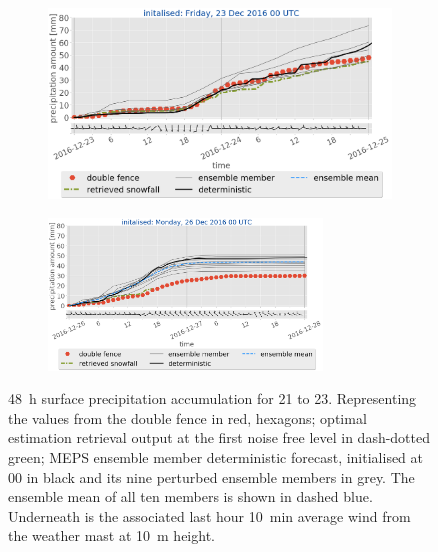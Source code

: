 \begin{figure}[H]
	\begin{subfigure}[t]{0.99\textwidth}	\includegraphics[trim={0.cm 5.2cm 0.cm 0cm},clip,width=\textwidth]{./fig_sfc_acc/acc_wind_20161223_00}
		\caption{}\label{fig:sfc_acc23}
	\end{subfigure}
	\begin{subfigure}[t]{\textwidth}
		\centering
		\includegraphics[trim={1.2cm 0cm 1.1cm 21.4cm},clip,width=0.8\textwidth]{./fig_sfc_acc/acc_wind_20161226_00}
	\end{subfigure}
	\caption{\SI{48}{\hour} surface precipitation accumulation for \num{21} to \SI{23}{\dec}. Representing the values from the double fence in red, hexagons; optimal estimation retrieval output at the first noise free level
		in dash-dotted green; MEPS ensemble member deterministic forecast, initialised at \SI{00}{\UTC} in black and its nine perturbed ensemble members in grey. The ensemble mean of all ten members is shown in dashed blue. Underneath is the associated last hour \SI{10}{\minute} average wind from the weather mast at \SI{10}{\metre} height. }\label{fig:sfc_acc:2123}
\end{figure}
